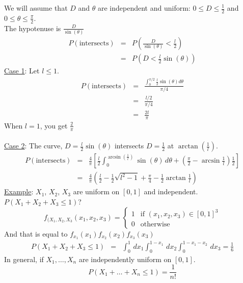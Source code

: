     \noindent We will assume that $D$ and $\theta$ are independent and uniform:
      $0 \le D \le \frac{1}{2}$ and $0 \le \theta \le \frac{\pi}{2}$.\\
      The hypotenuse is $\frac{D}{\sin(\theta)}$
    \begin{eqnarray*}
      P(\text{intersects}) & = & P\left(\frac{D}{\sin(\theta)} < \frac{l}{2}\right)\\
        & = & P(D < \frac{l}{2}\sin(\theta))
    \end{eqnarray*}
    \underline{Case 1}: Let $l \le 1$.\\
      \begin{eqnarray*}
        P(\text{intersects}) 
          & = & \frac{\int_0^{\pi / 2} \frac{l}{2} \sin(\theta) d\theta}{\pi/4}\\
          & = & \frac{l/2}{\pi/4}\\
          & = & \frac{2l}{\pi}
      \end{eqnarray*}
      When $l = 1$, you get $\frac{2}{\pi}$\\\\
    \underline{Case 2}: The curve, $D = \frac{l}{2} \sin(\theta)$ intersects
      $D = \frac{1}{2}$ at $\arctan(\frac{1}{l})$.\\
      \begin{eqnarray*}
        P(\text{intersects}) & = & \frac{4}{\pi}\left[ \frac{l}{2}  
          \int_0^{\arcsin(\frac{1}{l})}\sin(\theta)\,d\theta +
          \left(\frac{\pi}{2} - \arcsin\frac{1}{l}\right)\frac{1}{2} \right]\\
          & = & \frac{4}{\pi}\left(\frac{l}{2} - \frac{1}{2}\sqrt{l^2 -1}
            + \frac{\pi}{4} - \frac{1}{2} \arctan \frac{1}{l}\right)
      \end{eqnarray*}
  \underline{Example}:
    $X_1$, $X_2$, $X_3$ are uniform on $[0,1]$ and independent.\\
    $P(X_1 + X_2 + X_3 \le 1)$?\\
    $$
      f_{(X_1, X_2, X_3}(x_1, x_2, x_3) = \begin{cases} 1 & \text{if } 
        (x_1, x_2, x_3) \in [0,1]^3\\ 0 & \text{otherwise} \end{cases}
    $$
    And that is equal to $f_{x_1}(x_1) f_{x_2}(x_2) f_{x_3}(x_3)$ \\
    \begin{eqnarray*}
      P(X_1 + X_2 + X_3 \le 1) & = & \int_0^1 \,dx_1 \int_0^{1 - x_1} \,dx_2
        \int_0^{1-x_1 - x_2} \,dx_3 = \frac{1}{6}
    \end{eqnarray*}
    In general, if $X_1, \ldots, X_n$ are independently uniform on $[0,1]$.\\
    $$
      P(X_1 + \ldots + X_n \le 1) = \frac{1}{n!}
    $$

